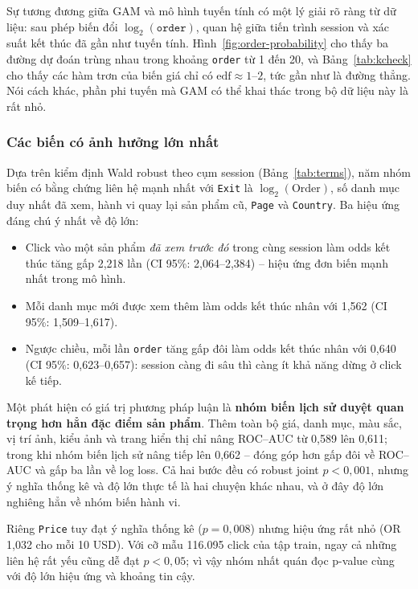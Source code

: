 Sự tương đương giữa GAM và mô hình tuyến tính có một lý giải rõ ràng từ dữ liệu:
sau phép biến đổi $\log_2(\texttt{order})$, quan hệ giữa tiến trình session và
xác suất kết thúc đã gần như tuyến tính. Hình~\ref{fig:order-probability} cho
thấy ba đường dự đoán trùng nhau trong khoảng \texttt{order} từ 1 đến 20, và
Bảng~\ref{tab:kcheck} cho thấy các hàm trơn của biến giá chỉ có
$\text{edf} \approx 1$--$2$, tức gần như là đường thẳng. Nói cách khác, phần phi
tuyến mà GAM có thể khai thác trong bộ dữ liệu này là rất nhỏ.

\subsubsection{Các biến có ảnh hưởng lớn nhất}

Dựa trên kiểm định Wald robust theo cụm session (Bảng~\ref{tab:terms}), năm nhóm
biến có bằng chứng liên hệ mạnh nhất với \texttt{Exit} là
$\log_2(\text{Order})$, số danh mục duy nhất đã xem, hành vi quay lại sản phẩm
cũ, \texttt{Page} và \texttt{Country}. Ba hiệu ứng đáng chú ý nhất về độ lớn:

\begin{itemize}
  \item Click vào một sản phẩm \emph{đã xem trước đó} trong cùng session làm odds
  kết thúc tăng gấp 2,218 lần (CI 95\%: 2,064--2,384) -- hiệu ứng đơn biến mạnh
  nhất trong mô hình.
  \item Mỗi danh mục mới được xem thêm làm odds kết thúc nhân với 1,562
  (CI 95\%: 1,509--1,617).
  \item Ngược chiều, mỗi lần \texttt{order} tăng gấp đôi làm odds kết thúc nhân
  với 0,640 (CI 95\%: 0,623--0,657): session càng đi sâu thì càng ít khả năng
  dừng ở click kế tiếp.
\end{itemize}

Một phát hiện có giá trị phương pháp luận là \textbf{nhóm biến lịch sử duyệt quan
trọng hơn hẳn đặc điểm sản phẩm}. Thêm toàn bộ giá, danh mục, màu sắc, vị trí
ảnh, kiểu ảnh và trang hiển thị chỉ nâng ROC--AUC từ 0,589 lên 0,611; trong khi
nhóm biến lịch sử nâng tiếp lên 0,662 -- đóng góp hơn gấp đôi về ROC--AUC và gấp
ba lần về log loss. Cả hai bước
đều có robust joint $p < 0{,}001$, nhưng ý nghĩa thống kê và độ lớn thực tế là
hai chuyện khác nhau, và ở đây độ lớn nghiêng hẳn về nhóm biến hành vi.

Riêng \texttt{Price} tuy đạt ý nghĩa thống kê ($p = 0{,}008$) nhưng hiệu ứng rất
nhỏ (OR 1,032 cho mỗi 10 USD). Với cỡ mẫu 116.095 click của tập train, ngay cả
những liên hệ rất yếu cũng dễ đạt $p < 0{,}05$; vì vậy nhóm nhất quán đọc p-value
cùng với độ lớn hiệu ứng và khoảng tin cậy.

